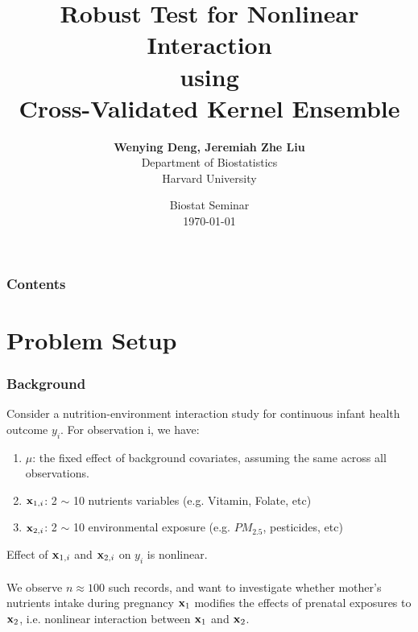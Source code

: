 \documentclass{beamer}
\begin{document}
\title{Robust Test for Nonlinear Interaction \\ using \\ 
Cross-Validated Kernel Ensemble}
\author{\textbf{Wenying Deng, Jeremiah Zhe Liu}\\ 
Department of Biostatistics \\
Harvard University}
\date{Biostat Seminar \\ \today}
\begin{frame}
\titlepage
\end{frame}

\begin{frame}
\frametitle{Contents} %
\tableofcontents[hideallsubsections]
\end{frame}

\section{Problem Setup} 

\begin{frame}
\frametitle{Background}

Consider a nutrition-environment interaction study for continuous infant health outcome $y_i$. For observation i, we have:
\begin{enumerate}
\item $\mu$: the fixed effect of background covariates, assuming the same across all observations.
\item ${\bf x}_{1,i}$: 2 $\sim$ 10 nutrients variables (e.g. Vitamin, Folate,  etc)
\item ${\bf x}_{2,i}$: 2 $\sim$ 10 environmental exposure (e.g. $PM_{2.5}$, pesticides, etc)
\end{enumerate}

Effect of ${\bf x}_{1,i}$ and ${\bf x}_{2,i}$ on $y_i$ is {\color{red}nonlinear}. \\ 
$ $ \\

We observe $n \approx 100$ such records, and want to investigate whether mother's nutrients intake during pregnancy ${\bf x}_1$ modifies the effects of prenatal exposures to ${\bf x}_2$, i.e. {\color{red}nonlinear interaction} between ${\bf x}_1$ and ${\bf x}_2$.

\end{frame}
\end{document}

